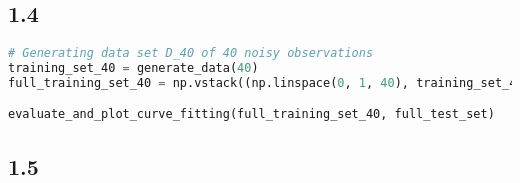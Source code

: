 \documentclass[a4paper]{article}
\begin{document}
\subsection*{1.4}


\begin{lstlisting}[language=Python]
# Generating data set D_40 of 40 noisy observations
training_set_40 = generate_data(40)
full_training_set_40 = np.vstack((np.linspace(0, 1, 40), training_set_40))

evaluate_and_plot_curve_fitting(full_training_set_40, full_test_set)
\end{lstlisting}


\subsection*{1.5}
\end{document}
